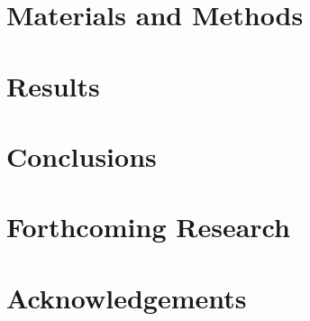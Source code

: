 \documentclass[a0,portrait]{a0poster}
\begin{document}
\begin{multicols}{2}
	\section*{Materials and Methods}
		

	\section*{Results}



	\color{DarkRed} %

	\section*{Conclusions}


	\color{DarkSlateGray} %


	\section*{Forthcoming Research}


	\nocite{*} %


	\section*{Acknowledgements}


\end{multicols}
\end{document}
